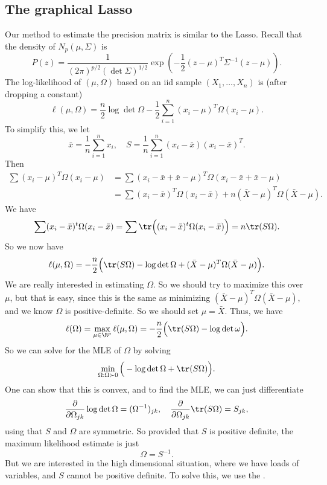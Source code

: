 \documentclass[a4paper]{article}
\begin{document}
\subsection{The graphical Lasso}
Our method to estimate the precision matrix is similar to the Lasso. Recall that the density of $N_p(\mu, \Sigma)$ is
\[
  P(z) = \frac{1}{(2\pi)^{p/2} (\det \Sigma)^{1/2}} \exp \left(-\frac{1}{2} (z - \mu)^T \Sigma^{-1} (z - \mu)\right).
\]
The log-likelihood of $(\mu, \Omega)$ based on an iid sample $(X_1, \ldots, X_n)$ is (after dropping a constant)
\[
  \ell(\mu, \Omega) = \frac{n}{2} \log \det \Omega - \frac{1}{2} \sum_{i = 1}^n (x_i - \mu)^T \Omega (x_i - \mu).
\]
To simplify this, we let
\[
  \bar{x} = \frac{1}{n} \sum_{i = 1}^n x_i,\quad S = \frac{1}{n} \sum_{i = 1}^n (x_i - \bar{x}) (x_i - \bar{x})^T.
\]
Then
\begin{align*}
  \sum (x_i - \mu)^T \Omega (x_i -\mu) &= \sum (x_i - \bar{x} + \bar{x} - \mu)^T \Omega (x_i - \bar{x} + \bar{x} - \mu) \\
  &= \sum (x_i - \bar{x})^T \Omega (x_i - \bar{x}) + n (\bar{X} - \mu)^T \Omega (\bar{X} - \mu).
\end{align*}
We have
\[
  \sum (x_i - \bar{x})^t \Omega (x_i - \bar{x}) = \sum \tr \Big((x_i - \bar{x})^t \Omega (x_i - \bar{x})\Big) = n \tr (S\Omega).
\]
So we now have
\[
  \ell(\mu, \Omega) = -\frac{n}{2} \Big(\tr (S\Omega) - \log \det \Omega + (\bar{X} - \mu)^T \Omega (\bar{X} - \mu)\Big).
\]
We are really interested in estimating $\Omega$. So we should try to maximize this over $\mu$, but that is easy, since this is the same as minimizing $(\bar{X} - \mu)^T \Omega (\bar{X} - \mu)$, and we know $\Omega$ is positive-definite. So we should set $\mu = \bar{X}$. Thus, we have
\[
  \ell(\Omega) = \max_{\mu \in \R^p} \ell(\mu, \Omega) = -\frac{n}{2} \Big(\tr (S\Omega) - \log \det \omega\Big).
\]
So we can solve for the MLE of $\Omega$ by solving
\[
  \min_{\Omega: \Omega \succ 0} \Big(- \log \det \Omega + \tr (S \Omega)\Big).
\]
One can show that this is convex, and to find the MLE, we can just differentiate
\[
  \frac{\partial}{\partial \Omega_{jk}} \log \det \Omega = (\Omega^{-1})_{jk},\quad \frac{\partial}{\partial \Omega_{jk}} \tr (S\Omega) = S_{jk},
\]
using that $S$ and $\Omega$ are symmetric. So provided that $S$ is positive definite, the maximum likelihood estimate is just
\[
  \Omega = S^{-1}.
\]
But we are interested in the high dimensional situation, where we have loads of variables, and $S$ cannot be positive definite. To solve this, we use the .
\end{document}
